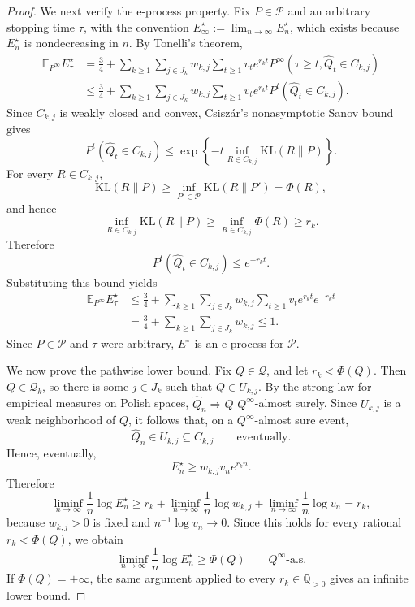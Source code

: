 \documentclass[11pt]{article}
\newcommand{\KL}{\mathrm{KL}}
\theoremstyle{definition}
\theoremstyle{definition}
\begin{document}
\begin{proof}
We next verify the e-process property. Fix \(P\in\mathcal P\) and an arbitrary stopping time
\(\tau\), with the convention \(E^\star_\infty:=\lim_{n\to\infty}E^\star_n\), which exists because
\(E^\star_n\) is nondecreasing in \(n\). By Tonelli's theorem,
\[
\begin{aligned}
  \mathbb E_{P^\infty}E^\star_\tau
  &=
  \frac34
  +
  \sum_{k\ge1}\sum_{j\in J_k}
  w_{k,j}
  \sum_{t\ge1}
  v_t e^{r_kt}
  P^\infty(\tau\ge t,\widehat Q_t\in C_{k,j})  \\
  &\le
  \frac34
  +
  \sum_{k\ge1}\sum_{j\in J_k}
  w_{k,j}
  \sum_{t\ge1}
  v_t e^{r_kt}
  P^t(\widehat Q_t\in C_{k,j}).
\end{aligned}
\]
Since \(C_{k,j}\) is weakly closed and convex, Csiszár's nonasymptotic Sanov bound gives
\[
  P^t(\widehat Q_t\in C_{k,j})
  \le
  \exp\left\{
    -t\inf_{R\in C_{k,j}}\KL(R\|P)
  \right\}.
\]
For every \(R\in C_{k,j}\),
\[
  \KL(R\|P)\ge \inf_{P'\in\mathcal P}\KL(R\|P')=\Phi(R),
\]
and hence
\[
  \inf_{R\in C_{k,j}}\KL(R\|P)
  \ge
  \inf_{R\in C_{k,j}}\Phi(R)
  \ge r_k.
\]
Therefore
\[
  P^t(\widehat Q_t\in C_{k,j})\le e^{-r_kt}.
\]
Substituting this bound yields
\[
\begin{aligned}
  \mathbb E_{P^\infty}E^\star_\tau
  &\le
  \frac34
  +
  \sum_{k\ge1}\sum_{j\in J_k}
  w_{k,j}
  \sum_{t\ge1}v_t e^{r_kt}e^{-r_kt}  \\
  &=
  \frac34
  +
  \sum_{k\ge1}\sum_{j\in J_k}w_{k,j}
  \le 1.
\end{aligned}
\]
Since \(P\in\mathcal P\) and \(\tau\) were arbitrary, \(E^\star\) is an e-process for
\(\mathcal P\).

We now prove the pathwise lower bound. Fix \(Q\in\mathcal Q\), and let \(r_k<\Phi(Q)\). Then
\(Q\in\mathcal Q_k\), so there is some \(j\in J_k\) such that \(Q\in U_{k,j}\). By the strong law
for empirical measures on Polish spaces, \(\widehat Q_n\Rightarrow Q\) \(Q^\infty\)-almost surely.
Since \(U_{k,j}\) is a weak neighborhood of \(Q\), it follows that, on a \(Q^\infty\)-almost sure event,
\[
  \widehat Q_n\in U_{k,j}\subseteq C_{k,j}
  \qquad\text{eventually}.
\]
Hence, eventually,
\[
  E^\star_n
  \ge
  w_{k,j}v_n e^{r_kn}.
\]
Therefore
\[
  \liminf_{n\to\infty}\frac1n\log E^\star_n
  \ge
  r_k
  +
  \liminf_{n\to\infty}\frac1n\log w_{k,j}
  +
  \liminf_{n\to\infty}\frac1n\log v_n
  =
  r_k,
\]
because \(w_{k,j}>0\) is fixed and \(n^{-1}\log v_n\to0\). Since this holds for every rational
\(r_k<\Phi(Q)\), we obtain
\[
  \liminf_{n\to\infty}\frac1n\log E^\star_n
  \ge
  \Phi(Q)
  \qquad Q^\infty\text{-a.s.}
\]
If \(\Phi(Q)=+\infty\), the same argument applied to every \(r_k\in\mathbb Q_{>0}\) gives an infinite
lower bound.


\end{proof}
\end{document}
